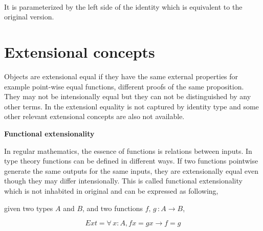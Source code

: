 \begin{itemize}
\begin{code}
\\
\>  \AgdaSymbol{\{} \AgdaSymbol{:} \AgdaSymbol{\}} \AgdaSymbol{(} \AgdaSymbol{:} \AgdaSymbol{)} \AgdaSymbol{:}    \<%
\\
\>[0]\<[2]%
\>[2] \AgdaSymbol{:}   \<%
\\
\end{code}
It is parameterized by the left side of the identity which is equivalent to the original version.



\end{itemize}



\section{Extensional concepts}
\label{extensionality}

Objects are extensional equal if they have the same external properties for example point-wise equal functions, different proofs of the same proposition. They may not be intensionally equal but they can not be distinguished by any other terms. In \itt the extensionl equality is not captured by identity type and some other relevant extensional concepts are also not available. 

\textbf{Functional extensionality} 

In regular mathematics, the essence of functions is relations between inputs. In type theory functions can be defined in different ways. If two functions pointwise generate the same outputs for the same inputs, they are extensionally equal even though they may differ intensionally. This is called
functional extensionality which is not inhabited \cite{alti:lics99} in original
\itt and can be expressed as following,




given two types $A$ and $B$, and two functions $f,\,g\,\colon A \to B$,

\[Ext = \forall\, x\colon A, f x = g x \to f = g\]


